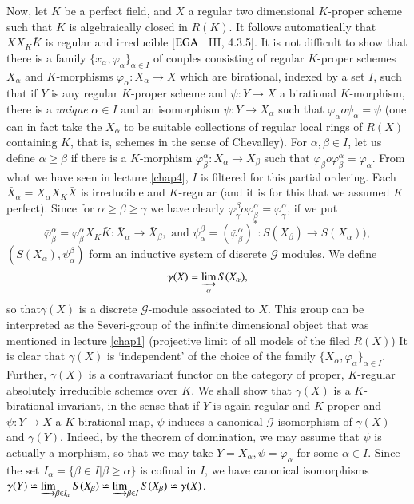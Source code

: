 Now, let $K$ be a perfect field, and $X$ a regular two dimensional
$K$-proper scheme such that $K$ is algebraically closed in $R(K)$. It
follows automatically that $X X_K \bar{K}$ is regular and irreducible
[$\operatorname{EGA}$~ III, 4.3.5]. It is not difficult to show that there is a
family $\{x_\alpha, \varphi_\alpha \}_{\alpha \in I}$ of couples
consisting of regular $K$-proper schemes $X_\alpha$ and $K$-morphisms
$\varphi_\alpha : X_\alpha \to X$ which are birational, indexed by a
set  $I$, such that if $Y$ is any regular $K$-proper scheme
and $\psi : Y \to X$ a birational $K$-morphism, there is a
\textit{unique} $\alpha \in I$ and an isomorphism $\psi : Y \to
X_\alpha$ such that $\varphi_\alpha o \psi_\alpha = \psi$ (one can in
fact take the $X_\alpha$ to be suitable collections of regular local rings of
$R(X)$ containing $K$, that is, schemes in the sense of
Chevalley). For $\alpha, \beta \in I$, let us define $\alpha \geq
\beta$ if there is a $K$-morphism $\varphi^{\alpha}_\beta : X_\alpha
\to X_\beta$ such that $\varphi_\beta o \varphi^{\alpha}_\beta =
\varphi_\alpha$. From what we have seen in lecture \ref{chap4}, $I$ is filtered
for this partial ordering. Each $\bar{X}_\alpha = X_\alpha X_K
\bar{X}$ is irreducible and $K$-regular (and it is for this that we
assumed $K$ perfect). Since for $\alpha \geq \beta \geq \gamma $ we
have clearly $\varphi^{\beta}_\gamma o \varphi^{\alpha}_\beta =
\varphi^{\alpha}_\gamma$, if we put 
$$
\bar{\varphi}^{\alpha}_\beta = \varphi^{\alpha}_\beta X_K \bar{K} :
\bar{X}_\alpha \to \bar{X}_\beta, \text { and } \psi^{\beta}_\alpha =
(\bar{\varphi}^{\alpha}_\beta)^* : S(X_\beta) \to S(X_\alpha)), 
$$
$(S(X_\alpha), \psi^{\beta}_\alpha)$ form an inductive system of
discrete $\mathscr{G}$ modules. We define 
$$
\gamma(X) = \varinjlim_\alpha S(X_\alpha),
$$
so that\pageoriginale $\gamma (X)$ is a discrete $\mathscr{G}$-module
associated to 
$X$. This group can be interpreted as the Severi-group of the infinite
dimensional object that was mentioned in lecture \ref{chap1} (projective limit
of all models of the filed $R(X)$) It is clear that $\gamma (X)$ is
`independent' of the choice of the family  $\{X_\alpha ,
\varphi_{\alpha}\}_{\alpha \in I}$. Further, $\gamma (X)$ is a
contravariant functor on the category of proper, $K$-regular
absolutely irreducible schemes over $K$. We shall show that $\gamma
(X)$ is a $K$-birational invariant, in the sense that if $Y$ is again
regular and $K$-proper and $\psi : Y \to X$ a $K$-birational map,
$\psi$ induces a canonical $\mathscr{G}$-isomorphism of $\gamma (X)$
and $\gamma (Y)$. Indeed, by the theorem of domination, we may assume
that $\psi$ is actually a morphism, so that we may take $Y=X_{\alpha},
\psi = \varphi_{\alpha}$ for some $\alpha \in I$. Since the set
$I_{\alpha}= \{\beta \in I | \beta \geq \alpha\}$ is cofinal in $I$,
we have canonical isomorphisms $\gamma (Y) \backsimeq
\varinjlim_{\beta \in I_{\alpha}} S(X_\beta) \backsimeq
\varinjlim_{\beta \in I} S(X_{\beta}) \backsimeq \gamma (X)$. 

